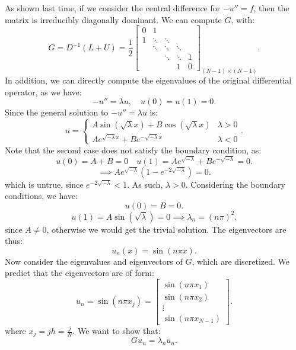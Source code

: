 \documentclass[../main/main.tex]{subfiles}
\begin{document}
   As shown last time, if we consider the central difference for $-u'' = f$, then the matrix is irreducibly diagonally dominant. We can compute $G$, with: \[
       G = D^{-1} (L+U) = \frac{1}{2}\begin{bmatrix} 0 & 1 & & & \\ 1 & \ddots &\ddots & & \\ &\ddots&\ddots&\ddots& \\ &&\ddots&\ddots&1 \\ &&&1& 0 \end{bmatrix} _{(N-1)\times (N-1)}
.\] 
In addition, we can directly compute the eigenvalues of the original differential operator, as we have: \[
    -u'' = \lambda u, \quad u(0) = u(1) = 0
.\] Since the general solution to $-u'' = \lambda u$ is: \[
u=
\begin{cases}
     A\sin (\sqrt{\lambda} x) +B \cos(\sqrt{\lambda} x ) & \lambda > 0 \\
    Ae^{\sqrt{-\lambda} x } +B e^{-\sqrt{-\lambda} x }& \lambda < 0 
\end{cases}
.\]  
Note that the second case does not satisfy the boundary condition, as: \[
    u(0) = A+B = 0 \quad u(1) = Ae^{\sqrt{-\lambda} } + B e^{-\sqrt{-\lambda} } = 0
.\] \[
\implies A e^{\sqrt{-\lambda} } (1-e^{-2\sqrt{-\lambda} }) = 0
.\] which is untrue, since $e^{-2\sqrt{-\lambda} } < 1$. As such, $\lambda>0$. Considering the boundary conditions, we have: \[
u(0) = B = 0
.\] \[
u(1) = A\sin(\sqrt{\lambda}) = 0 \implies \lambda_n =  (n \pi)^2
.\] since $A\neq 0$, otherwise we would get the trivial solution. The eigenvectors are thus: \[
u_n(x) = \sin (n\pi x)
.\] 
Now consider the eigenvalues and eigenvectors of $G$, which are discretized. We predict that the eigenvectors are of form: \[
    u_n = \sin (n\pi x_j) = \begin{bmatrix} \sin(n\pi x_1) \\ \sin(n\pi x_2) \\ \vdots \\\sin(n\pi x_{N-1})\end{bmatrix} 
.\] where $x_j = jh = \frac{j}{N}$. We want to show that:\[
G u_n = \lambda_n u_n
.\] 
\end{document}
